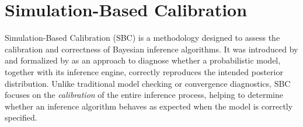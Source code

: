 \chapter{Simulation-Based Calibration}
\label{sbc}

Simulation-Based Calibration (SBC) is a methodology designed to assess the calibration and correctness of Bayesian inference algorithms.
It was introduced by \textcite{cook_2006} and formalized by \textcite{talts_2020} as an approach to diagnose whether a probabilistic model, together with its inference engine, correctly reproduces the intended posterior distribution.
Unlike traditional model checking or convergence diagnostics, SBC focuses on the \emph{calibration} of the entire inference process, helping to determine whether an inference algorithm behaves as expected when the model is correctly specified.








